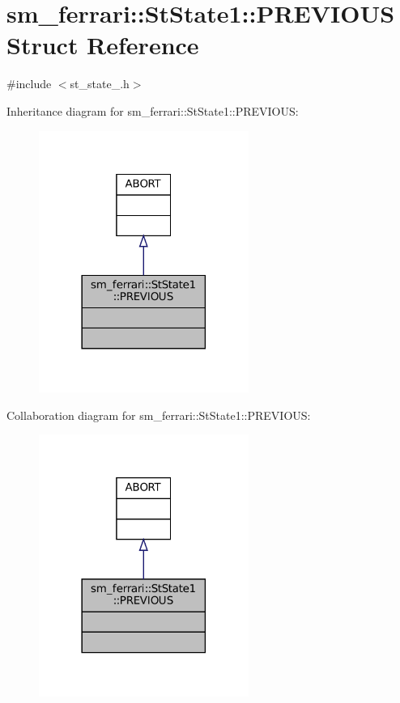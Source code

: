 \hypertarget{structsm__ferrari_1_1StState1_1_1PREVIOUS}{}\section{sm\+\_\+ferrari\+:\+:St\+State1\+:\+:P\+R\+E\+V\+I\+O\+US Struct Reference}
\label{structsm__ferrari_1_1StState1_1_1PREVIOUS}


{\ttfamily \#include $<$st\+\_\+state\+\_.\+h$>$}



Inheritance diagram for sm\+\_\+ferrari\+:\+:St\+State1\+:\+:P\+R\+E\+V\+I\+O\+US\+:
\nopagebreak
\begin{figure}[H]
\begin{center}
\leavevmode
\includegraphics[width=194pt]{structsm__ferrari_1_1StState1_1_1PREVIOUS__inherit__graph}
\end{center}
\end{figure}


Collaboration diagram for sm\+\_\+ferrari\+:\+:St\+State1\+:\+:P\+R\+E\+V\+I\+O\+US\+:
\nopagebreak
\begin{figure}[H]
\begin{center}
\leavevmode
\includegraphics[width=194pt]{structsm__ferrari_1_1StState1_1_1PREVIOUS__coll__graph}
\end{center}
\end{figure}


